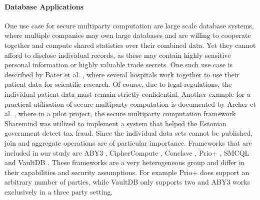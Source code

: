\paragraph{Database Applications}
One use case for secure multiparty computation are large scale database systems, where multiple companies may own large databases and are willing to cooperate together and compute shared statistics over their combined data. Yet they cannot afford to disclose individual records, as these may contain highly sensitive personal information or highly valuable trade secrets. One such use case is described by Bater et al. \cite{bater}, where several hospitals work together to use their patient data for scientific research. Of course, due to legal regulations, the individual patient data must remain strictly confidential. Another example for a practical utilisation of secure multiparty computation is documented by Archer et al. \cite{Archer2018FromKT}, where in a pilot project, the secure multiparty computation framework Sharemind \cite{bogdanov2015estonian} was utilized to implement a system that helped the Estonian government detect tax fraud. Since the individual data sets cannot be published, join and aggregate operations are of particular importance. Frameworks that are included in our study are ABY3 \cite{aby3}, CipherCompute \cite{Cosmian}, Conclave \cite{10.1145/3302424.3303982}, Prio+ \cite{cryptoeprint:2021:576} , SMCQL \cite{bater} and VaultDB \cite{rogers2022vaultdb}. These frameworks are a very heterogeneous group and differ in their capabilities and security assumptions. For example Prio+ does support an arbitrary number of parties, while VaultDB only supports two and ABY3 works exclusively in a three party setting.












